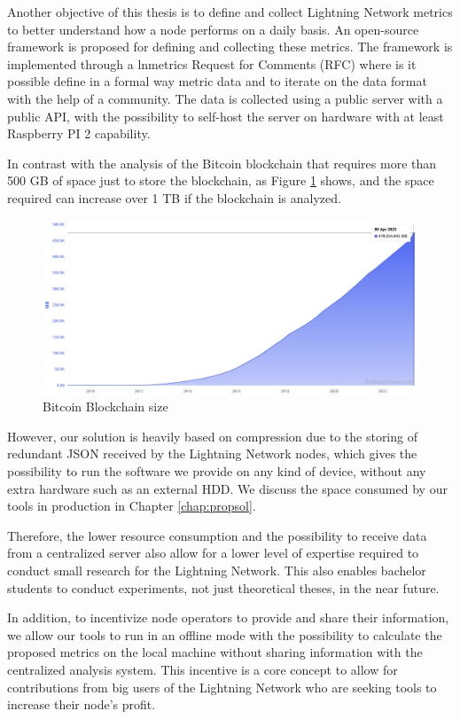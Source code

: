 Another objective of this thesis is to define and collect Lightning Network
metrics to better understand how a node performs on a daily basis. An open-source
framework is proposed for defining and collecting these metrics. The framework
is implemented through a lnmetrics Request for Comments (RFC) where is it possible define
in a formal way metric data and to iterate on the data format with the help of a community.
The data is collected using a public server with a public API, with the possibility to
self-host the server on hardware with at least Raspberry PI 2 capability.

In contrast with the analysis of the Bitcoin blockchain that requires more than
500 GB of space just to store the blockchain, as Figure \ref{fig:blockchain_size} shows,
and the space required can increase over 1 TB if the blockchain is analyzed.

\begin{figure}[h]
  \begin{center}
    \includegraphics[width=0.6\columnwidth]{imgs/bitcoin-blockchain-size.png}
  \end{center}
  \caption{Bitcoin Blockchain size}
  \label{fig:blockchain_size}
\end{figure}

However, our solution is heavily based on compression due to the storing of redundant JSON received
by the Lightning Network nodes, which gives the possibility to run the software we provide on
any kind of device, without any extra hardware such as an external HDD. We discuss the space
consumed by our tools in production in Chapter \ref{chap:propsol}.

Therefore, the lower resource consumption and the possibility to receive data from a
centralized server also allow for a lower level of expertise required to conduct small
research for the Lightning Network. This also enables bachelor students to conduct
experiments, not just theoretical theses, in the near future.

In addition, to incentivize node operators to provide and share their information, we allow our
tools to run in an offline mode with the possibility to calculate the proposed metrics on the
local machine without sharing information with the centralized analysis system. This incentive
is a core concept to allow for contributions from big users of the Lightning Network who are
seeking tools to increase their node's profit.
